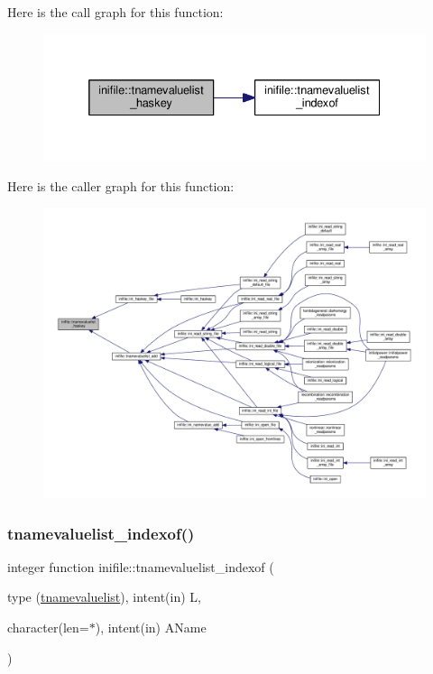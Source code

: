 Here is the call graph for this function\+:
\nopagebreak
\begin{figure}[H]
\begin{center}
\leavevmode
\includegraphics[width=332pt]{namespaceinifile_af36608910f6418a922996326dd9a97e3_cgraph}
\end{center}
\end{figure}
Here is the caller graph for this function\+:
\nopagebreak
\begin{figure}[H]
\begin{center}
\leavevmode
\includegraphics[width=350pt]{namespaceinifile_af36608910f6418a922996326dd9a97e3_icgraph}
\end{center}
\end{figure}
\mbox{\label{namespaceinifile_a040f1b3c4c75c262385aa1452ec39343}} 
\subsubsection{\texorpdfstring{tnamevaluelist\+\_\+indexof()}{tnamevaluelist\_indexof()}}
{\footnotesize\ttfamily integer function inifile\+::tnamevaluelist\+\_\+indexof (\begin{DoxyParamCaption}\item[{type (\mbox{\hyperlink{structinifile_1_1tnamevaluelist}{tnamevaluelist}}), intent(in)}]{L,  }\item[{character(len=$\ast$), intent(in)}]{A\+Name }\end{DoxyParamCaption})}



